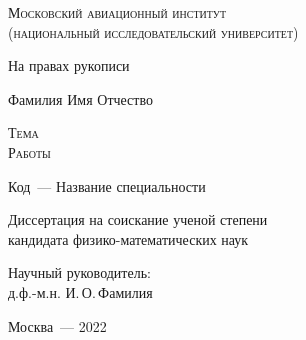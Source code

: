 \thispagestyle{empty}


\begin{titlepage}
\begin{center}
\textsc{Московский авиационный институт \\ (национальный исследовательский университет)}\\
\end{center}
\vspace{1.5cm}
\begin{flushright}
{На правах рукописи}
\end{flushright}
\vspace{1.5cm}
\begin{center}
{Фамилия Имя Отчество}
\par
\vspace{2cm}
\textsc{Тема \\Работы}
\par
\vspace{2cm}
{Код~--- Название специальности}
\par
\vspace{2cm}
{Диссертация на соискание ученой степени\\
кандидата физико-математических наук}
\end{center}
\vspace{2cm}
\hfill\parbox{8,4cm}{Научный руководитель:
\\д.ф.-м.н. И.\,О.\,Фамилия}
\par
\vspace{3.5cm}
\begin{center}
{Москва~--- 2022}
\end{center}
\end{titlepage}